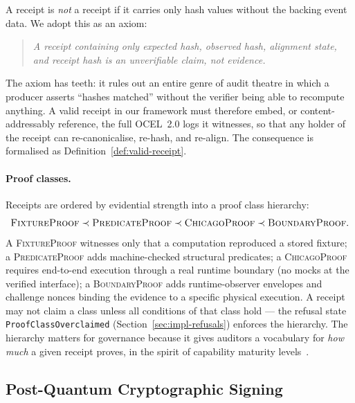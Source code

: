 A receipt is \emph{not} a receipt if it carries only hash values without the
backing event data. We adopt this as an axiom:

\begin{quote}
\itshape A receipt containing only expected hash, observed hash, alignment
state, and receipt hash is an unverifiable claim, not evidence.
\end{quote}

The axiom has teeth: it rules out an entire genre of audit theatre in which a
producer asserts ``hashes matched'' without the verifier being able to recompute
anything. A valid receipt in our framework must therefore embed, or
content-addressably reference, the full OCEL~2.0 logs it witnesses, so that any
holder of the receipt can re-canonicalise, re-hash, and re-align. The
consequence is formalised as Definition~\ref{def:valid-receipt}.

\paragraph{Proof classes.}
Receipts are ordered by evidential strength into a proof class hierarchy:
\[
  \textsc{FixtureProof} \prec \textsc{PredicateProof} \prec
  \textsc{ChicagoProof} \prec \textsc{BoundaryProof}.
\]
A \textsc{FixtureProof} witnesses only that a computation reproduced a stored
fixture; a \textsc{PredicateProof} adds machine-checked structural predicates;
a \textsc{ChicagoProof} requires end-to-end execution through a real runtime
boundary (no mocks at the verified interface); a \textsc{BoundaryProof} adds
runtime-observer envelopes and challenge nonces binding the evidence to a
specific physical execution. A receipt may not claim a class unless all
conditions of that class hold --- the refusal state
\texttt{ProofClassOverclaimed} (Section~\ref{sec:impl-refusals}) enforces the
hierarchy. The hierarchy matters for governance because it gives auditors a
vocabulary for \emph{how much} a given receipt proves, in the spirit of
capability maturity levels~\cite{sok_ccmm_2024}.

\subsection{Post-Quantum Cryptographic Signing}
\label{sec:bg-pqc}

